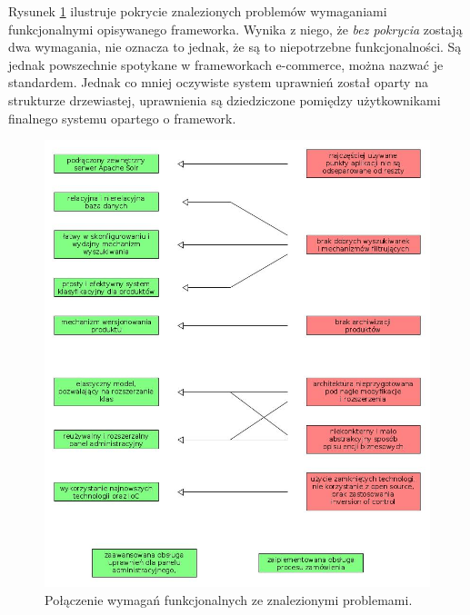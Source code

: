 Rysunek \ref{wymagania} ilustruje pokrycie znalezionych problemów wymaganiami funkcjonalnymi opisywanego frameworka. Wynika z niego, że \textit{bez pokrycia} zostają dwa wymagania, nie oznacza to jednak, że są to niepotrzebne funkcjonalności. Są jednak powszechnie spotykane w frameworkach e-commerce, można nazwać je standardem. Jednak co mniej oczywiste system uprawnień został oparty na strukturze drzewiastej, uprawnienia są dziedziczone pomiędzy użytkownikami finalnego systemu opartego o framework.
\begin{figure}
	\begin{center}
		\includegraphics[width=1\textwidth]{wymagania.jpg}
	\end{center}
	\caption{{\color{dgray}Połączenie wymagań funkcjonalnych ze znalezionymi problemami.}} \label{wymagania}
\end{figure}
